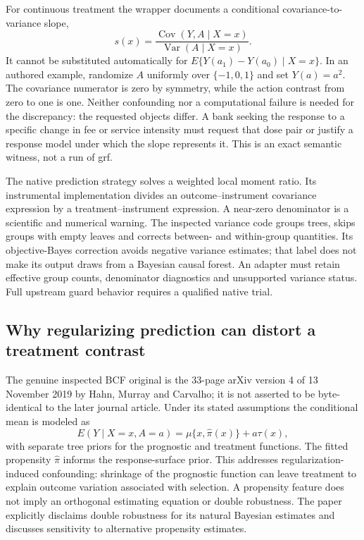 For continuous treatment the wrapper documents a conditional covariance-to-variance slope,
\begin{equation}
 s(x)=\frac{\operatorname{Cov}(Y,A\mid X=x)}{\operatorname{Var}(A\mid X=x)}.
 \label{exec21:cxx-slope}
\end{equation}
It cannot be substituted automatically for $E\{Y(a_1)-Y(a_0)\mid X=x\}$. In an authored example, randomize $A$ uniformly over $\{-1,0,1\}$ and set $Y(a)=a^2$. The covariance numerator is zero by symmetry, while the action contrast from zero to one is one. Neither confounding nor a computational failure is needed for the discrepancy: the requested objects differ. A bank seeking the response to a specific change in fee or service intensity must request that dose pair or justify a response model under which the slope represents it. This is an exact semantic witness, not a run of grf.~\citep{exec21_cxx_grf,exec21_cxx_reference}

The native prediction strategy solves a weighted local moment ratio. Its instrumental implementation divides an outcome--instrument covariance expression by a treatment--instrument expression. A near-zero denominator is a scientific and numerical warning. The inspected variance code groups trees, skips groups with empty leaves and corrects between- and within-group quantities. Its objective-Bayes correction avoids negative variance estimates; that label does not make its output draws from a Bayesian causal forest. An adapter must retain effective group counts, denominator diagnostics and unsupported variance status. Full upstream guard behavior requires a qualified native trial.~\citep{exec21_cxx_grf}

\subsection{Why regularizing prediction can distort a treatment contrast}
\label{exec21:cxx-prior}
The genuine inspected BCF original is the 33-page arXiv version 4 of 13 November 2019 by Hahn, Murray and Carvalho; it is not asserted to be byte-identical to the later journal article. Under its stated assumptions the conditional mean is modeled as
\begin{equation}
 E(Y\mid X=x,A=a)=\mu\{x,\widehat\pi(x)\}+a\tau(x),
 \label{exec21:cxx-bcf-model}
\end{equation}
with separate tree priors for the prognostic and treatment functions. The fitted propensity $\widehat\pi$ informs the response-surface prior. This addresses regularization-induced confounding: shrinkage of the prognostic function can leave treatment to explain outcome variation associated with selection. A propensity feature does not imply an orthogonal estimating equation or double robustness. The paper explicitly disclaims double robustness for its natural Bayesian estimates and discusses sensitivity to alternative propensity estimates.~\citep{exec21_cxx_hahn}

